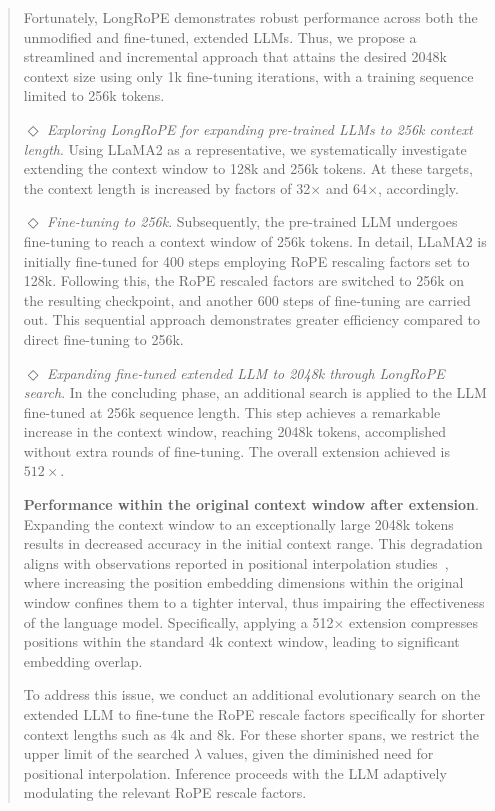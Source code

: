 \begin{abstract}
Fortunately, LongRoPE demonstrates robust performance across both the unmodified and fine-tuned, extended LLMs. Thus, we propose a streamlined and incremental approach that attains the desired 2048k context size using only 1k fine-tuning iterations, with a training sequence limited to 256k tokens.

$\Diamond$ \textit{Exploring LongRoPE for expanding pre-trained LLMs to 256k context length}. Using LLaMA2 as a representative, we systematically investigate extending the context window to 128k and 256k tokens. At these targets, the context length is increased by factors of 32$\times$ and 64$\times$, accordingly.

$\Diamond$ \textit{Fine-tuning to 256k}. Subsequently, the pre-trained LLM undergoes fine-tuning to reach a context window of 256k tokens. In detail, LLaMA2 is initially fine-tuned for 400 steps employing RoPE rescaling factors set to 128k. Following this, the RoPE rescaled factors are switched to 256k on the resulting checkpoint, and another 600 steps of fine-tuning are carried out. This sequential approach demonstrates greater efficiency compared to direct fine-tuning to 256k.

$\Diamond$ \textit{Expanding fine-tuned extended LLM to 2048k through LongRoPE search}. In the concluding phase, an additional search is applied to the LLM fine-tuned at 256k sequence length. This step achieves a remarkable increase in the context window, reaching 2048k tokens, accomplished without extra rounds of fine-tuning. The overall extension achieved is $512\times$.

\textbf{Performance within the original context window after extension}.  Expanding the context window to an exceptionally large 2048k tokens results in decreased accuracy in the initial context range. This degradation aligns with observations reported in positional interpolation studies~\cite{pi}, where increasing the position embedding dimensions within the original window confines them to a tighter interval, thus impairing the effectiveness of the language model. Specifically, applying a 512$\times$ extension compresses positions within the standard 4k context window, leading to significant embedding overlap.

To address this issue, we conduct an additional evolutionary search on the extended LLM to fine-tune the RoPE rescale factors specifically for shorter context lengths such as 4k and 8k. For these shorter spans, we restrict the upper limit of the searched $\lambda$ values, given the diminished need for positional interpolation. Inference proceeds with the LLM adaptively modulating the relevant RoPE rescale factors.


\end{abstract}
